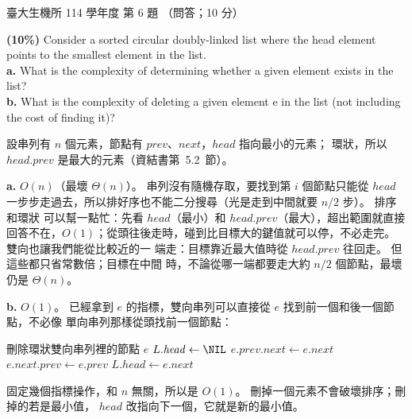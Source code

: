 \begin{pastexam}[label={px:ntu-114-bime-ds-06}]{臺大生機所 114 學年度 第 6 題}
（問答；10 分）

\textbf{(10\%)} Consider a sorted circular doubly-linked list where the head element points to the
smallest element in the list.\\
\textbf{a.} What is the complexity of determining whether a given element exists in the list?\\
\textbf{b.} What is the complexity of deleting a given element e in the list (not including the
cost of finding it)?
\end{pastexam}

\begin{pastsoln}
設串列有 $n$ 個元素，節點有 $\mathit{prev}$、$\mathit{next}$，$\mathit{head}$ 指向最小的元素；
環狀，所以 $\mathit{head}.\mathit{prev}$ 是最大的元素（資結書第~5.2~節）。

\textbf{a.} $O(n)$（最壞 $\Theta(n)$）。 串列沒有隨機存取，要找到第 $i$ 個節點只能從
$\mathit{head}$ 一步步走過去，所以排好序也不能二分搜尋（光是走到中間就要 $n/2$ 步）。 排序和環狀
可以幫一點忙：先看 $\mathit{head}$（最小）和 $\mathit{head}.\mathit{prev}$（最大），超出範圍就直接
回答不在，$O(1)$；從頭往後走時，碰到比目標大的鍵值就可以停，不必走完。 雙向也讓我們能從比較近的一
端走：目標靠近最大值時從 $\mathit{head}.\mathit{prev}$ 往回走。 但這些都只省常數倍；目標在中間
時，不論從哪一端都要走大約 $n/2$ 個節點，最壞仍是 $\Theta(n)$。

\textbf{b.} $O(1)$。 已經拿到 $e$ 的指標，雙向串列可以直接從 $e$ 找到前一個和後一個節點，不必像
單向串列那樣從頭找前一個節點：
\begin{pseudo}{刪除環狀雙向串列裡的節點 $e$}
        \State $L.\mathit{head} \gets \NIL$ 
    \Else
        \State $e.\mathit{prev}.\mathit{next} \gets e.\mathit{next}$
        \State $e.\mathit{next}.\mathit{prev} \gets e.\mathit{prev}$
            \State $L.\mathit{head} \gets e.\mathit{next}$ 
        \EndIf
    \EndIf
\EndProcedure
\end{pseudo}
固定幾個指標操作，和 $n$ 無關，所以是 $O(1)$。 刪掉一個元素不會破壞排序；刪掉的若是最小值，
$\mathit{head}$ 改指向下一個，它就是新的最小值。
\end{pastsoln}
